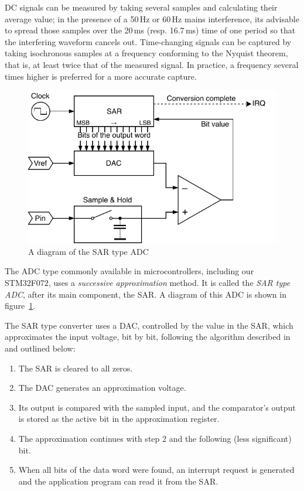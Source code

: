 \gls{DC} signals can be measured by taking several samples and calculating their average value; in the presence of a 50\,Hz or 60\,Hz mains interference, its advisable to spread those samples over the 20\,ms (resp. 16.7\,ms) time of one period so that the interfering waveform cancels out. Time-changing signals can be captured by taking isochronous samples at a frequency conforming to the Nyquist theorem, that is, at least twice that of the measured signal. In practice, a frequency several times higher is preferred for a more accurate capture.

\begin{figure}
	\centering
	\includegraphics[scale=1] {img/sar-adc.pdf}
	\caption{\label{fig:adc-sar}A diagram of the SAR type ADC}
\end{figure}

The \gls{ADC} type commonly available in microcontrollers, including our STM32F072, uses a \textit{successive approximation} method. It is called the \textit{SAR type \gls{ADC}}, after its main component, the \gls{SAR}. A diagram of this \gls{ADC} is shown in figure~\ref{fig:adc-sar}.

The \gls{SAR} type converter uses a \gls{DAC}, controlled by the value in the \gls{SAR}, which approximates the input voltage, bit by bit, following the algorithm described in~\cite{adc-sar} and outlined below:

\begin{enumerate}
	\item The \gls{SAR} is cleared to all zeros.
	\item The \gls{DAC} generates an approximation voltage.
	\item Its output is compared with the sampled input, and the comparator's output is stored as the active bit in the approximation register.
	\item The approximation continues with step 2 and the following (less significant) bit.
	\item When all bits of the data word were found, an interrupt request is generated and the application program can read it from the \gls{SAR}.
\end{enumerate}

